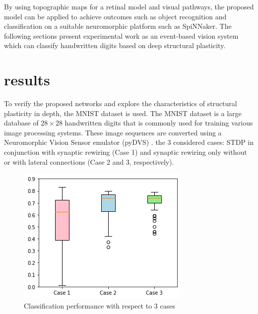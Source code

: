 \documentclass[preprint,12pt]{elsarticle}
\begin{document}
By using topographic maps for a retinal model and visual pathways, the proposed model can be applied to achieve outcomes such as object recognition and classification on a suitable neuromorphic platform such as SpiNNaker.
The following sections present experimental work as an event-based vision system which can classify handwritten digits based on deep structural plasticity.

\section{results}\label{section:results}

To verify the proposed networks and explore the characteristics of structural plasticity in depth, the MNIST dataset is used. 
The MNIST dataset is a large database of $28 \times 28$ handwritten digits that is commonly used for training various image processing systems. 
These image sequences are converted using a Neuromorphic Vision Sensor emulator (pyDVS) \cite{garcia2016pydvs}.
the 3 considered cases: STDP in conjunction with synaptic rewiring (Case 1) and synaptic rewiring only without or with lateral connections (Case 2 and 3, respectively).

\begin{figure}[tbh]
    \centering
    \includegraphics[width=0.80\linewidth, trim=0cm 0cm 0cm 0cm, clip=true]{10trials/boxPlotCase}
    \caption{Classification performance with respect to 3 cases}
    \label{fig:bpWCases}
\end{figure}
\end{document}
